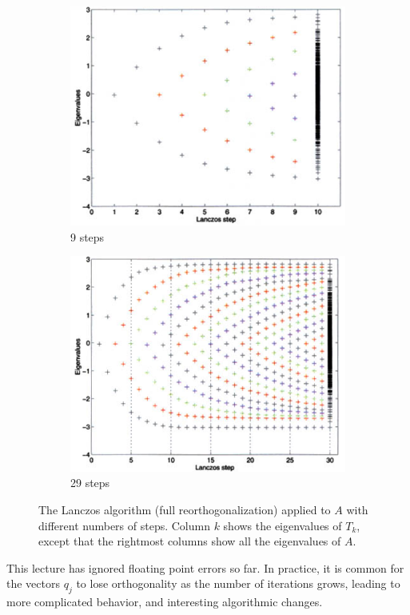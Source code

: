 \documentclass[11pt]{article}
\numberwithin{equation}{section}
\begin{document}
\begin{figure}[h]
    \centering
    \begin{subfigure}{.5\textwidth}
      \centering
      \includegraphics[width=.9\linewidth]{images/lec14-2.png}
      \caption{9 steps}
    \end{subfigure}%
    \begin{subfigure}{.5\textwidth}
      \centering
      \includegraphics[width=.9\linewidth]{images/lec14-3.png}
      \caption{29 steps}
    \end{subfigure}
    \caption{The Lanczos algorithm (full reorthogonalization) applied to $A$ with different numbers of steps. Column $k$ shows the eigenvalues of $T_k$, 
    except that the rightmost columns show all the eigenvalues of $A$.}
\end{figure}

This lecture has ignored floating point errors so far. In practice, it is common for the vectors $q_j$ to lose orthogonality as the number of iterations grows, 
leading to more complicated behavior, and interesting algorithmic changes.
\end{document}
